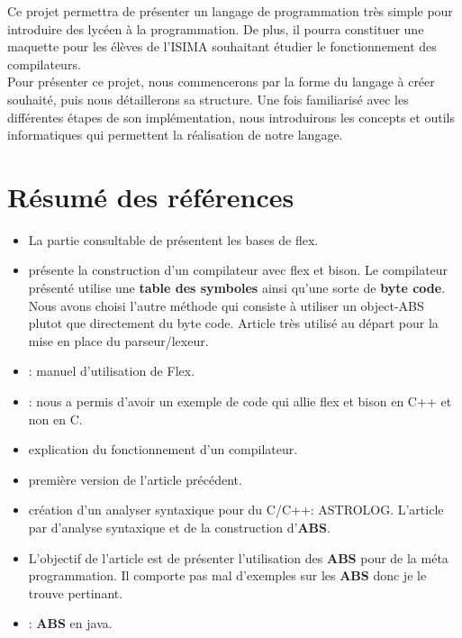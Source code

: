 \documentclass[a4paper]{article}%
\begin{document}
Ce projet permettra de présenter un langage de programmation très simple pour
introduire des lycéen à la programmation. De plus, il pourra constituer une
maquette pour les élèves de l'ISIMA souhaitant étudier le fonctionnement des
compilateurs.\\

Pour présenter ce projet, nous commencerons par la forme du langage à créer
souhaité, puis nous détaillerons sa structure. Une fois familiarisé avec les
différentes étapes de son implémentation,  nous introduirons les concepts et
outils informatiques qui permettent la réalisation de notre langage.\\

\normalsize
\clearpage{}%

\section{Résumé des références}

\begin{itemize}
  \item La partie consultable de \cite{flexBisonHandbook} présentent les bases
    de flex.
  \item \cite{compilerFlexBison} présente la construction d'un compilateur avec
    flex et bison. Le compilateur présenté utilise une \textbf{table des
    symboles} ainsi qu'une sorte de \textbf{byte code}. Nous avons choisi
    l'autre méthode qui consiste à utiliser un object-ABS plutot que directement
    du byte code. Article très utilisé au départ pour la mise en place du
    parseur/lexeur.
  \item \cite{flexmanual}: manuel d'utilisation de Flex.
  \item \cite{cppparsing}: nous a permis d'avoir un exemple de code qui allie
    flex et bison en C++ et non en C.


  \item \cite{compilerTICH} explication du fonctionnement d'un compilateur.
  \item \cite{compilerTILB} première version de l'article précédent.
  \item \cite{crew1997astlog} création d'un analyser syntaxique pour du C/C++:
    ASTROLOG. L'article par d'analyse syntaxique et de la construction
    d'\textbf{ABS}.

  \item \cite{visser2002meta} L'objectif de l'article est de présenter
    l'utilisation des \textbf{ABS} pour de la méta programmation. Il comporte
    pas mal d'exemples sur les \textbf{ABS} donc je le trouve pertinant.
  \item \cite{gagnon1998sablecc}: \textbf{ABS} en java.
\end{itemize}
\end{document}
